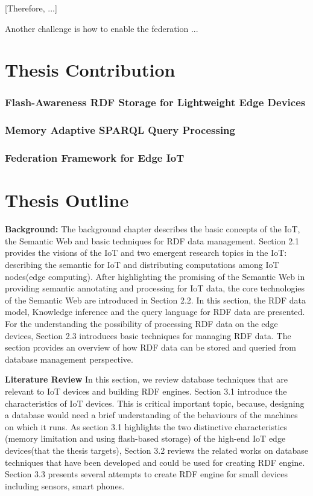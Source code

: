 [Therefore, ...]

Another challenge is how to enable the federation ...



\section{Thesis Contribution}

\subsubsection*{Flash-Awareness RDF Storage for Lightweight Edge Devices}


\subsubsection*{Memory Adaptive SPARQL Query Processing}

\subsubsection*{Federation Framework for Edge IoT}

\newpage
\section{Thesis Outline}

\textbf{Background: }
The background chapter describes the basic concepts of the IoT, the Semantic Web and basic techniques for RDF data management.
Section 2.1 provides the visions of the IoT and two emergent research topics in the IoT: describing the semantic for IoT and distributing computations among IoT nodes(edge computing).
After highlighting the promising of the Semantic Web in providing semantic annotating and processing for IoT data, the core technologies of the Semantic Web are introduced in Section 2.2. 
In this section, the RDF data model, Knowledge inference and the query language for RDF data are presented. 
For the understanding the possibility of processing RDF data on the edge devices, Section 2.3 introduces basic techniques for managing RDF data. 
The section provides an overview of how RDF data can be stored and queried from database management perspective.

\textbf{Literature Review}
In this section, we review database techniques that are relevant to IoT devices and building RDF engines. 
Section 3.1 introduce the characteristics of IoT devices.
This is critical important topic, because,  designing a database would need a brief understanding of the behaviours of the machines on which it runs.
As section 3.1 highlights the two distinctive characteristics (memory limitation and using flash-based storage) of the high-end IoT edge devices(that the thesis targets), Section 3.2 reviews the related works on database techniques that have been developed and could be used for creating RDF engine.
Section 3.3 presents several attempts to create RDF engine for small devices including sensors, smart phones.

